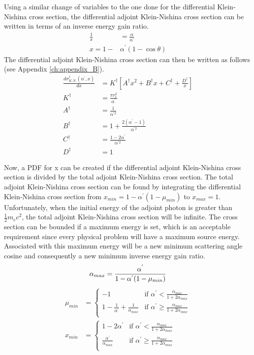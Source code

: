 Using a similar change of variables to the one done for the differential 
Klein-Nishina cross section, the differential adjoint Klein-Nishina cross 
section can be written in terms of an inverse energy gain ratio.
\begin{align}
  \frac{1}{x} & = \frac{\alpha}{\alpha^{'}} \\
  x = 1 - &\alpha^{'}(1-\cos{\theta})
\end{align}
The differential adjoint Klein-Nishina cross section can then be written as 
follows (see Appendix \ref{ch:appendix_B}).
\begin{align}
  \frac{d\sigma_{K.N.}^{\dagger}(\alpha^{'},x)}{dx} & = 
  K^{\dagger}\left[A^{\dagger}x^2 + B^{\dagger}x
    + C^{\dagger} + \frac{D^{\dagger}}{x} \right] \\
  K^{\dagger} & = \frac{\pi r_e^2}{\alpha^{'}} \nonumber \\
  A^{\dagger} & = \frac{1}{\alpha^{'2}} \nonumber \\
  B^{\dagger} & = 1 + \frac{2(\alpha^{'}-1)}{\alpha^{'2}} \nonumber \\
  C^{\dagger} & = \frac{1-2\alpha^{'}}{\alpha^{'2}} \nonumber \\
  D^{\dagger} & = 1 \nonumber 
\end{align}

Now, a PDF for x can be created if the differential adjoint Klein-Nishina cross
section is divided by the total adjoint Klein-Nishina cross section. The total
adjoint Klein-Nishina cross section can be found by integrating the differential
Klein-Nishina cross section from $x_{min} = 1-\alpha^{'}(1-\mu_{min})$ to 
$x_{max} = 1$. Unfortunately, when the initial energy of the adjoint photon is
greater than $\frac{1}{2}m_ec^2$, the total adjoint Klein-Nishina cross section
will be infinite. The cross section can be bounded if a maximum energy is set, 
which is an acceptable requirement since every physical problem will have a 
maximum source energy. Associated with this maximum energy will be a new 
minimum scattering angle cosine and consequently a new minimum inverse energy 
gain ratio. 
\begin{equation*}
  \alpha_{max} = \frac{\alpha^{'}}{1-\alpha^{'}(1-\mu_{min})} \nonumber \\
\end{equation*}
\begin{align}
  \mu_{min} & = 
  \begin{cases}
    -1 & \text{if } \alpha^{'} < \frac{\alpha_{max}}{1+2\alpha_{max}} \\
    1 - \frac{1}{\alpha^{'}} + \frac{1}{\alpha_{max}} 
    & \text{if } \alpha^{'} \geq \frac{\alpha_{max}}{1+2\alpha_{max}} \\ 
  \end{cases} \\
  x_{min} & = 
  \begin{cases}
    1-2\alpha^{'} & \text{if } \alpha^{'} < \frac{\alpha_{max}}{1+2\alpha_{max}} \\
    \frac{\alpha^{'}}{\alpha_{max}} & \text{if } \alpha^{'} \geq
    \frac{\alpha_{max}}{1+2\alpha_{max}} \\
  \end{cases}
\end{align}

